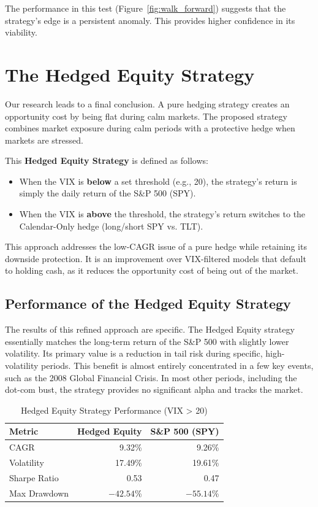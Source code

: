 \documentclass{article}
\begin{document}
The performance in this test (Figure~\ref{fig:walk_forward}) suggests that the strategy's edge is a persistent anomaly. This provides higher confidence in its viability.

\section{The Hedged Equity Strategy}
Our research leads to a final conclusion. A pure hedging strategy creates an opportunity cost by being flat during calm markets. The proposed strategy combines market exposure during calm periods with a protective hedge when markets are stressed.

This \textbf{Hedged Equity Strategy} is defined as follows:
\begin{itemize}
    \item When the VIX is \textbf{below} a set threshold (e.g., 20), the strategy's return is simply the daily return of the S\&P 500 (SPY).
    \item When the VIX is \textbf{above} the threshold, the strategy's return switches to the Calendar-Only hedge (long/short SPY vs. TLT).
\end{itemize}

This approach addresses the low-CAGR issue of a pure hedge while retaining its downside protection. It is an improvement over VIX-filtered models that default to holding cash, as it reduces the opportunity cost of being out of the market.

\subsection{Performance of the Hedged Equity Strategy}
The results of this refined approach are specific. The Hedged Equity strategy essentially matches the long-term return of the S\&P 500 with slightly lower volatility. Its primary value is a reduction in tail risk during specific, high-volatility periods. This benefit is almost entirely concentrated in a few key events, such as the 2008 Global Financial Crisis. In most other periods, including the dot-com bust, the strategy provides no significant alpha and tracks the market.

\begin{table}[htbp]
\centering
\caption{Hedged Equity Strategy Performance (VIX > 20)}
\begin{tabular}{lrr}
\toprule
\textbf{Metric} & \textbf{Hedged Equity} & \textbf{S\&P 500 (SPY)} \\
\midrule
CAGR           & 9.32\%    & 9.26\%         \\
Volatility     & 17.49\%   & 19.61\%        \\
Sharpe Ratio   & 0.53      & 0.47           \\
Max Drawdown   & $-42.54$\% & $-55.14$\%      \\
\bottomrule
\end{tabular}
\end{table}
\end{document}
